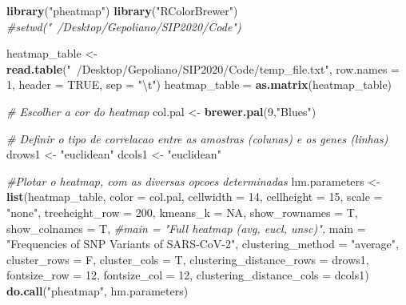 \documentclass[
]{article}
\newenvironment{Shaded}{\begin{snugshade}}{\end{snugshade}}
\newcommand{\CharTok}[1]{\textcolor[rgb]{0.31,0.60,0.02}{#1}}
\newcommand{\CommentTok}[1]{\textcolor[rgb]{0.56,0.35,0.01}{\textit{#1}}}
\newcommand{\DataTypeTok}[1]{\textcolor[rgb]{0.13,0.29,0.53}{#1}}
\newcommand{\DecValTok}[1]{\textcolor[rgb]{0.00,0.00,0.81}{#1}}
\newcommand{\KeywordTok}[1]{\textcolor[rgb]{0.13,0.29,0.53}{\textbf{#1}}}
\newcommand{\NormalTok}[1]{#1}
\newcommand{\OtherTok}[1]{\textcolor[rgb]{0.56,0.35,0.01}{#1}}
\newcommand{\StringTok}[1]{\textcolor[rgb]{0.31,0.60,0.02}{#1}}
\begin{document}
\begin{Shaded}
\begin{Highlighting}[]
\KeywordTok{library}\NormalTok{(}\StringTok{"pheatmap"}\NormalTok{)}
\KeywordTok{library}\NormalTok{(}\StringTok{"RColorBrewer"}\NormalTok{)}
\CommentTok{#setwd("~/Desktop/Gepoliano/SIP2020/Code")}

\NormalTok{heatmap_table <-}\StringTok{ }\KeywordTok{read.table}\NormalTok{(}\StringTok{"~/Desktop/Gepoliano/SIP2020/Code/temp_file.txt"}\NormalTok{, }\DataTypeTok{row.names =} \DecValTok{1}\NormalTok{, }\DataTypeTok{header =} \OtherTok{TRUE}\NormalTok{, }\DataTypeTok{sep =} \StringTok{"}\CharTok{\textbackslash{}t}\StringTok{"}\NormalTok{)}
\NormalTok{heatmap_table =}\StringTok{ }\KeywordTok{as.matrix}\NormalTok{(heatmap_table)}

\CommentTok{# Escolher a cor do heatmap}
\NormalTok{col.pal <-}\StringTok{ }\KeywordTok{brewer.pal}\NormalTok{(}\DecValTok{9}\NormalTok{,}\StringTok{"Blues"}\NormalTok{)}

\CommentTok{# Definir o tipo de correlacao entre as amostras (colunas) e os genes (linhas)}
\NormalTok{drows1 <-}\StringTok{ "euclidean"}
\NormalTok{dcols1 <-}\StringTok{ "euclidean"}

\CommentTok{#Plotar o heatmap, com as diversas opcoes determinadas}
\NormalTok{hm.parameters <-}\StringTok{ }\KeywordTok{list}\NormalTok{(heatmap_table, }
                      \DataTypeTok{color =}\NormalTok{ col.pal,}
                      \DataTypeTok{cellwidth =} \DecValTok{14}\NormalTok{, }\DataTypeTok{cellheight =} \DecValTok{15}\NormalTok{, }\DataTypeTok{scale =} \StringTok{"none"}\NormalTok{,}
                      \DataTypeTok{treeheight_row =} \DecValTok{200}\NormalTok{,}
                      \DataTypeTok{kmeans_k =} \OtherTok{NA}\NormalTok{,}
                      \DataTypeTok{show_rownames =}\NormalTok{ T, }\DataTypeTok{show_colnames =}\NormalTok{ T,}
                      \CommentTok{#main = "Full heatmap (avg, eucl, unsc)",}
                      \DataTypeTok{main =} \StringTok{"Frequencies of SNP Variants of SARS-CoV-2"}\NormalTok{,}
                      \DataTypeTok{clustering_method =} \StringTok{"average"}\NormalTok{,}
                      \DataTypeTok{cluster_rows =}\NormalTok{ F, }\DataTypeTok{cluster_cols =}\NormalTok{ T,}
                      \DataTypeTok{clustering_distance_rows =}\NormalTok{ drows1, }
                      \DataTypeTok{fontsize_row =} \DecValTok{12}\NormalTok{,}
                      \DataTypeTok{fontsize_col =} \DecValTok{12}\NormalTok{,}
                      \DataTypeTok{clustering_distance_cols =}\NormalTok{ dcols1)}
\KeywordTok{do.call}\NormalTok{(}\StringTok{"pheatmap"}\NormalTok{, hm.parameters)}
\end{Highlighting}
\end{Shaded}
\end{document}
